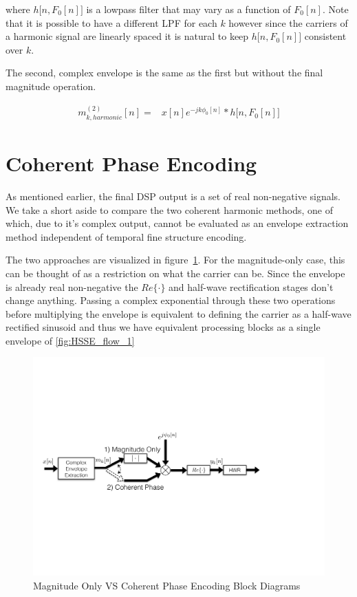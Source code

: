 \documentclass [11pt, proquest,oneside] {ganter_thesis}[2015/03/03]
\begin{document}
where $h\big[n, F_0[n] \big]$ is a lowpass filter that may vary as a function of $F_0[n]$.  Note that it is possible to have a different LPF for each $k$ however since the carriers of a harmonic signal are linearly spaced it is natural to keep $h\big[n, F_0[n] \big]$ consistent over $k$.

The second, complex envelope is the same as the first but without the final magnitude operation.

\begin{align}
m^{(2)}_{k,harmonic}[n] =& x[n] e^{-jk\phi_0 [n]} * h\big[n, F_0[n] \big]
\end{align}

\section{Coherent Phase Encoding}

As mentioned earlier, the final DSP output is a set of real non-negative signals.  We take a short aside to compare the two coherent harmonic methods, one of which, due to it's complex output, cannot be evaluated as an envelope extraction method independent of temporal fine structure encoding.

The two approaches are visualized in figure~\ref{fig:coherent_angle}.  For the magnitude-only case, this can be thought of as a restriction on what the carrier can be.  Since the envelope is already real non-negative the $Re\{\cdot\}$ and half-wave rectification stages don't change anything.  Passing a complex exponential through these two operations before multiplying the envelope is equivalent to defining the carrier as a half-wave rectified sinusoid and thus we have equivalent processing blocks as a single envelope of \ref{fig:HSSE_flow_1}


\begin{figure}[!ht]
  \centering
    \includegraphics[width=1\textwidth]{coherent_phase}   
    \caption{Magnitude Only VS Coherent Phase Encoding Block Diagrams}
    \label{fig:coherent_angle}
\end{figure}
\end{document}
